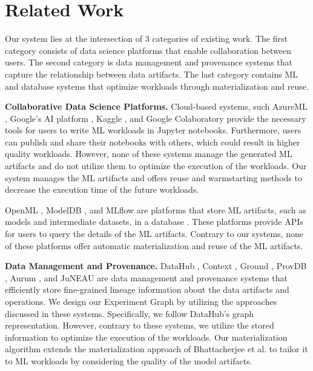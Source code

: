 \section{Related Work} \label{sec-related-work}
Our system lies at the intersection of 3 categories of existing work.
The first category consists of data science platforms that enable collaboration between users.
The second category is data management and provenance systems that capture the relationship between data artifacts.
The last category contains ML and database systems that optimize workloads through materialization and reuse.

\textbf{Collaborative Data Science Platforms.}
Cloud-based systems, such AzureML \cite{team2016azureml}, Google's AI platform \cite{googleai}, Kaggle \cite{kagglewebsite}, and Google Colaboratory \cite{googlecolab} provide the necessary tools for users to write ML workloads in Jupyter notebooks.
Furthermore, users can publish and share their notebooks with others, which could result in higher quality workloads.
However, none of these systems manage the generated ML artifacts and do not utilize them to optimize the execution of the workloads.
Our system manages the ML artifacts and offers reuse and warmstarting methods to decrease the execution time of the future workloads.

OpenML \cite{vanschoren2014openml}, ModelDB \cite{vartak2016m}, and MLflow \cite{zaharia2018accelerating} are platforms that store ML artifacts, such as models and intermediate datasets, in a database \cite{schelter2017automatically, Vanschoren2012}.
These platforms provide APIs for users to query the details of the ML artifacts.
Contrary to our systems, none of these platforms offer automatic materialization and reuse of the ML artifacts.

\textbf{Data Management and Provenance.}
DataHub \cite{bhardwaj2014datahub, bhattacherjee2015principles}, Context \cite{garcia2018context}, Ground \cite{hellerstein2017ground}, ProvDB \cite{miao2018provdb}, Aurum \cite{fernandez2018aurum}, and JuNEAU \cite{ives2019dataset} are data management and provenance systems that efficiently store fine-grained lineage information about the data artifacts and operations.
We design our Experiment Graph by utilizing the approaches discussed in these systems.
Specifically, we follow DataHub's graph representation.
However, contrary to these systems, we utilize the stored information to optimize the execution of the workloads.
Our materialization algorithm extends the materialization approach of Bhattacherjee et al. \cite{bhattacherjee2015principles} to tailor it to ML workloads by considering the quality of the model artifacts.


